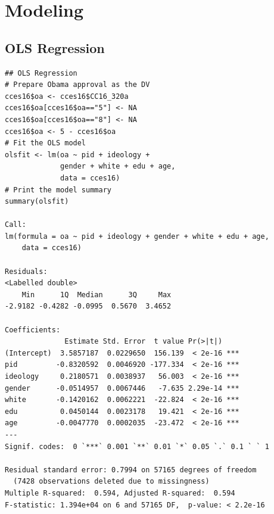 \documentclass[12pt, letterpaper,notitlepage]{article}
\begin{document}
\newpage
\section{Modeling}
\subsection{OLS Regression}
\begin{lstlisting}
## OLS Regression
# Prepare Obama approval as the DV
cces16$oa <- cces16$CC16_320a
cces16$oa[cces16$oa=="5"] <- NA
cces16$oa[cces16$oa=="8"] <- NA
cces16$oa <- 5 - cces16$oa
# Fit the OLS model
olsfit <- lm(oa ~ pid + ideology +
             gender + white + edu + age,
             data = cces16)
# Print the model summary
summary(olsfit)

Call:
lm(formula = oa ~ pid + ideology + gender + white + edu + age, 
    data = cces16)

Residuals:
<Labelled double>
    Min      1Q  Median      3Q     Max 
-2.9182 -0.4282 -0.0995  0.5670  3.4652 

Coefficients:
              Estimate Std. Error  t value Pr(>|t|)    
(Intercept)  3.5857187  0.0229650  156.139  < 2e-16 ***
pid         -0.8320592  0.0046920 -177.334  < 2e-16 ***
ideology     0.2180571  0.0038937   56.003  < 2e-16 ***
gender      -0.0514957  0.0067446   -7.635 2.29e-14 ***
white       -0.1420162  0.0062221  -22.824  < 2e-16 ***
edu          0.0450144  0.0023178   19.421  < 2e-16 ***
age         -0.0047770  0.0002035  -23.472  < 2e-16 ***
---
Signif. codes:  0 `***` 0.001 `**` 0.01 `*` 0.05 `.` 0.1 ` ` 1

Residual standard error: 0.7994 on 57165 degrees of freedom
  (7428 observations deleted due to missingness)
Multiple R-squared:  0.594,	Adjusted R-squared:  0.594 
F-statistic: 1.394e+04 on 6 and 57165 DF,  p-value: < 2.2e-16
\end{lstlisting}

\newpage
\end{document}
